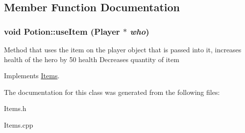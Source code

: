 \subsection{Member Function Documentation}
\hypertarget{classPotion_a66940bbc4925bd3bf2b29e5fcd8bd1f4}{
\subsubsection[{useItem}]{\setlength{\rightskip}{0pt plus 5cm}void Potion::useItem ({\bf Player} $\ast$ {\em who})}}
\label{classPotion_a66940bbc4925bd3bf2b29e5fcd8bd1f4}
Method that uses the item on the player object that is passed into it, increases health of the hero by 50 health Decreases quantity of item 

Implements \hyperlink{classItems}{Items}.

The documentation for this class was generated from the following files:\begin{DoxyCompactItemize}
\item 
Items.h\item 
Items.cpp\end{DoxyCompactItemize}
